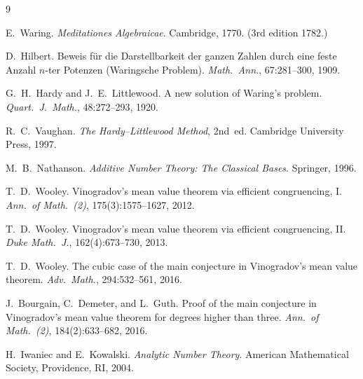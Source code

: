 \documentclass[12pt,a4paper]{amsart}
\theoremstyle{definition}
\begin{document}
\begin{thebibliography}{9}

E.~Waring.
\newblock \emph{Meditationes Algebraicae}.
\newblock Cambridge, 1770.  (3rd edition 1782.)

D.~Hilbert.
\newblock Beweis für die Darstellbarkeit der ganzen Zahlen durch eine feste
  Anzahl $n$-ter Potenzen (Waringsche Problem).
\newblock \emph{Math.\ Ann.}, 67:281--300, 1909.

G.~H.~Hardy and J.~E.~Littlewood.
\newblock A new solution of Waring's problem.
\newblock \emph{Quart.\ J.\ Math.}, 48:272--293, 1920.

R.~C.~Vaughan.
\newblock \emph{The Hardy--Littlewood Method}, 2nd~ed.
\newblock Cambridge University Press, 1997.

M.~B.~Nathanson.
\newblock \emph{Additive Number Theory: The Classical Bases}.
\newblock Springer, 1996.

T.~D.~Wooley.
\newblock Vinogradov's mean value theorem via efficient congruencing, I.
\newblock \emph{Ann.\ of Math.\ (2)}, 175(3):1575--1627, 2012.

T.~D.~Wooley.
\newblock Vinogradov's mean value theorem via efficient congruencing, II.
\newblock \emph{Duke Math.\ J.}, 162(4):673--730, 2013.

T.~D.~Wooley.
\newblock The cubic case of the main conjecture in Vinogradov's mean value theorem.
\newblock \emph{Adv.\ Math.}, 294:532--561, 2016.

J.~Bourgain, C.~Demeter, and L.~Guth.
\newblock Proof of the main conjecture in Vinogradov's mean value theorem for
  degrees higher than three.
\newblock \emph{Ann.\ of Math.\ (2)}, 184(2):633--682, 2016.

H.~Iwaniec and E.~Kowalski.
\newblock \emph{Analytic Number Theory}.
\newblock American Mathematical Society, Providence, RI, 2004.

\end{thebibliography}
\end{document}

